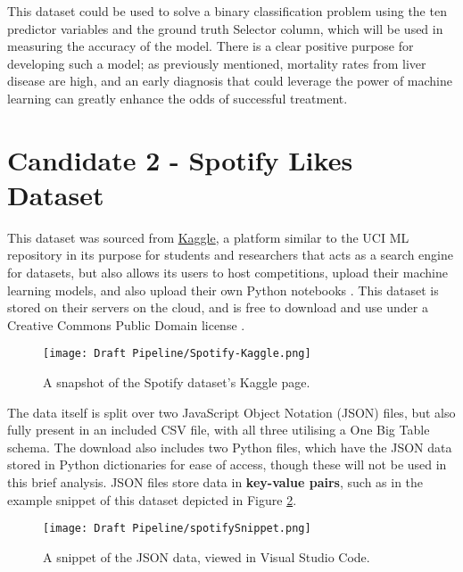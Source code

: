 This dataset could be used to solve a binary classification problem using the ten predictor 
variables and the ground truth Selector column, which will be used in measuring the accuracy of the model. There is a clear 
positive purpose for developing such a model; as previously mentioned, mortality rates from liver disease are high, and an early
diagnosis that could leverage the power of machine learning can greatly enhance the odds of successful treatment.

\pagebreak

\section{Candidate 2 - Spotify Likes Dataset}
This dataset \autocite{vergnou_spotify_nodate} was sourced from \href{https://www.kaggle.com/datasets}{Kaggle}, a platform similar to the UCI ML repository in its 
purpose for students and researchers that acts as a search engine for datasets, but also allows its users to host competitions, upload their machine learning models, and also upload 
their own Python notebooks \autocite{kaggle_kaggle_nodate}. This dataset is stored on their servers on the cloud, and is free to download and use under a 
Creative Commons Public Domain license \autocite{creative_commons_deed_nodate}.

\begin{figure}[H]
    \centering
    \texttt{[image: Draft Pipeline/Spotify-Kaggle.png]}
    \caption{A snapshot of the Spotify dataset's Kaggle page.}
    \label{fig:Spotify-Kaggle}
\end{figure}

The data itself is split over 
two JavaScript Object Notation (JSON) files, but also fully present in an included CSV file, with all three utilising a One Big Table schema. The 
download also includes two Python files, which have the JSON data stored in Python dictionaries for ease of access, though these will not be used in 
this brief analysis. JSON files store data in \textbf{key-value pairs}, such as in the example snippet of this dataset depicted in Figure \ref{fig:spotifySnippet}.  

\begin{figure}[H]
    \centering
    \texttt{[image: Draft Pipeline/spotifySnippet.png]}
    \caption{A snippet of the JSON data, viewed in Visual Studio Code.}
    \label{fig:spotifySnippet}
\end{figure}

